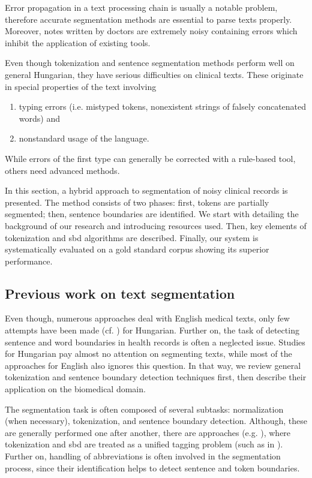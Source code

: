Error propagation in a text processing chain is usually a notable problem, therefore accurate segmentation methods are essential to parse texts properly.
Moreover, notes written by doctors are extremely noisy containing errors which inhibit the application of existing tools.

Even though tokenization and sentence segmentation methods perform well on general Hungarian, they have serious difficulties on clinical texts.
These originate in special properties of the text involving
\begin{enumerate} %
 \item typing errors (i.e. mistyped tokens, nonexistent strings of falsely concatenated words) and
 \item nonstandard usage of the language.
\end{enumerate}
While errors of the first type can generally be corrected with a rule-based tool, others need advanced methods. 

In this section, a hybrid approach to segmentation of noisy clinical records is presented. 
The method consists of two phases: first, tokens are partially segmented; then, sentence boundaries are identified.
We start with detailing the background of our research and introducing resources used.
Then, key elements of tokenization and \gls{sbd} algorithms are described. 
Finally, our system is systematically evaluated on a gold standard corpus showing its superior performance.

\subsection{Previous work on text segmentation}

Even though, numerous approaches deal with English medical texts, only few attempts have been made (cf. \cite{Siklosi2012,Siklosi2013,Siklosi2013b}) for Hungarian. 
Further on, the task of detecting sentence and word boundaries in health records is often a neglected issue.
Studies for Hungarian pay almost no attention on segmenting texts, while
most of the approaches for English also ignores this question. 
In that way, we review general tokenization and sentence boundary detection techniques first, then describe their application on the biomedical domain.

The segmentation task is often composed of several subtasks: normalization (when necessary), tokenization, and sentence boundary detection.  
Although, these are generally performed one after another, there are approaches (e.g. \cite{zhu2007unified}), where tokenization and \acrshort{sbd} are treated as a unified tagging problem (such as in \cite{mikheev2000tagging}). 
Further on, handling of abbreviations is often involved in the segmentation process, since their identification helps to detect sentence and token boundaries.

